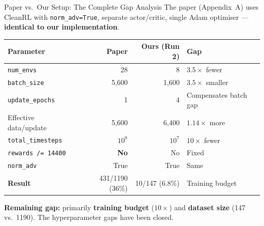 \documentclass[aspectratio=169,11pt]{beamer}
\begin{document}
\begin{frame}{Paper vs.\ Our Setup: The Complete Gap Analysis}
  \footnotesize
  The paper (Appendix~A) uses CleanRL with \texttt{norm\_adv=True}, separate actor/critic,
  single Adam optimiser --- \textbf{identical to our implementation}.

  \medskip
  \begin{center}
  \begin{tabular}{lrrl}
    \toprule
    \textbf{Parameter} & \textbf{Paper} & \textbf{Ours (Run 2)} & \textbf{Gap} \\
    \midrule
    \texttt{num\_envs}         & 28      & 8       & $3.5\times$ fewer \\
    \texttt{batch\_size}       & 5{,}600 & 1{,}600 & $3.5\times$ smaller \\
    \texttt{update\_epochs}    & 1       & \textcolor{good}{4} & \textcolor{good}{Compensates batch gap} \\
    Effective data/update      & 5{,}600 & \textcolor{good}{6{,}400} & \textcolor{good}{$1.14\times$ more} \\
    \texttt{total\_timesteps}  & $10^8$  & $10^7$  & $10\times$ fewer \\
    \texttt{rewards /= 14400}  & \textbf{No} & \textcolor{good}{No}  & \textcolor{good}{Fixed} \\
    \texttt{norm\_adv}         & True    & True    & Same \\
    \midrule
    \textbf{Result}            & \textcolor{good}{431/1190 (36\%)} & 10/147 (6.8\%) & Training budget \\
    \bottomrule
  \end{tabular}
  \end{center}

  \medskip
  \textbf{Remaining gap:} primarily \textbf{training budget} ($10\times$) and
  \textbf{dataset size} (147 vs.\ 1190).  The hyperparameter gaps have been closed.
\end{frame}
\end{document}

